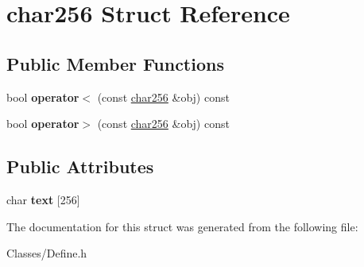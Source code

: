 \hypertarget{structchar256}{}\section{char256 Struct Reference}
\label{structchar256}
\subsection*{Public Member Functions}
\begin{DoxyCompactItemize}
\item 
bool {\bfseries operator$<$} (const \hyperlink{structchar256}{char256} \&obj) const \hypertarget{structchar256_ae1e38ad98d5f1cd7b21eb00f5379258e}{}\label{structchar256_ae1e38ad98d5f1cd7b21eb00f5379258e}

\item 
bool {\bfseries operator$>$} (const \hyperlink{structchar256}{char256} \&obj) const \hypertarget{structchar256_ac6ef98c7fbeb2792cfca198a7764b42a}{}\label{structchar256_ac6ef98c7fbeb2792cfca198a7764b42a}

\end{DoxyCompactItemize}
\subsection*{Public Attributes}
\begin{DoxyCompactItemize}
\item 
char {\bfseries text} \mbox{[}256\mbox{]}\hypertarget{structchar256_a86d4f7bb76a19f3b7eabeb4e8d86d472}{}\label{structchar256_a86d4f7bb76a19f3b7eabeb4e8d86d472}

\end{DoxyCompactItemize}


The documentation for this struct was generated from the following file\+:\begin{DoxyCompactItemize}
\item 
Classes/Define.\+h\end{DoxyCompactItemize}
